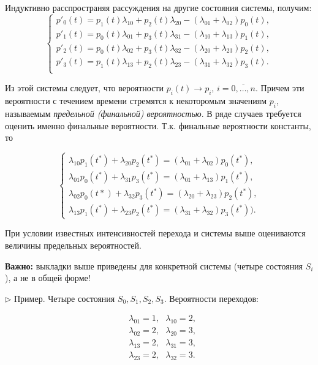 \documentclass[12pt]{article}
\begin{document}
Индуктивно расспространяя рассуждения на другие состояния системы, получим:
\[
\begin{cases}
    p'_0(t) = p_1 (t) \lambda_{10} + p_2 (t) \lambda_{20} - (\lambda_{01} + \lambda_{02}) p_0 (t),\\
    p'_1(t) = p_0 (t) \lambda_{01} + p_3 (t) \lambda_{31} - (\lambda_{10} + \lambda_{13}) p_1 (t),\\
    p'_2(t) = p_0 (t) \lambda_{02} + p_3 (t) \lambda_{32} - (\lambda_{20} + \lambda_{23}) p_2 (t),\\
    p'_3(t) = p_1 (t) \lambda_{13} + p_2 (t) \lambda_{23} - (\lambda_{31} + \lambda_{32}) p_3 (t).\\
\end{cases}
\]

Из этой системы следует, что вероятности $p_i(t) \to p_i$, $i = \overline{0, \ldots, n}$. Причем эти вероятности с течением времени стремятся к некоторомым значениям $p_i$, называемым \emph{предельной (финальной) вероятностью}. В ряде случаев требуется оценить именно финальные вероятности. Т.к. финальные вероятности константы, то

\[
\begin{cases} 
    \lambda_{10} p_1(t^*) + \lambda_{20} p_2(t^*) = (\lambda_{01} + \lambda_{02}) p_0 (t^*),\\
    \lambda_{01} p_0(t^*) + \lambda_{31} p_3(t^*) = (\lambda_{01} + \lambda_{13}) p_1(t^*),\\
    \lambda_{02} p_0(t*) + \lambda_{32} p_3(t^*) = (\lambda_{20} + \lambda_{23}) p_2(t^*),\\
    \lambda_{13} p_1 (t^*) + \lambda_{23} p_2(t^*) = (\lambda_{31} + \lambda_{32}) p_3(t^*)).
\end{cases}
\]

При условии известных интенсивностей перехода и системы выше оцениваются величины предельных вероятностей.

\begin{framed}
    \textbf{Важно:} выкладки выше приведены для конкретной системы (четыре состояния $S_i$), а не в общей форме!
\end{framed}

$\triangleright$ Пример. Четыре состояния $S_0, S_1, S_2, S_3$. Вероятности переходов: 

\begin{align*}
    &\lambda_{01} = 1, ~~~\lambda_{10} = 2,\\
    &\lambda_{02} = 2, ~~~\lambda_{20} = 3,\\
    &\lambda_{13} = 2, ~~~\lambda_{31} = 3,\\
    &\lambda_{23} = 2, ~~~\lambda_{32} = 3.
\end{align*}
\end{document}
